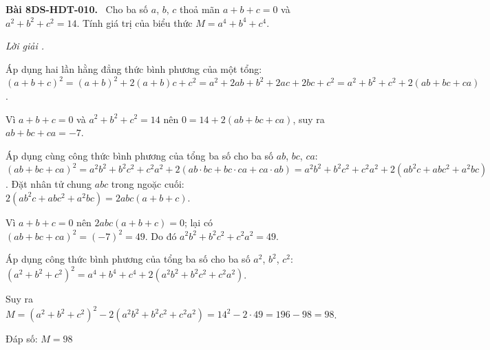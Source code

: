 \documentclass[12pt,a4paper]{article}
\newenvironment{problem}[1][]{\par\medskip\noindent\textbf{Bài #1.}\ }{\par}
\newenvironment{solution}[1][]{\par\noindent\textit{Lời giải #1.}\par}{\par}
\begin{document}
\begin{problem}[8DS-HDT-010]
Cho ba số $a$, $b$, $c$ thoả mãn $a + b + c = 0$ và $a^2 + b^2 + c^2 = 14$. Tính giá trị của biểu thức $M = a^4 + b^4 + c^4$.

\begin{solution}
Áp dụng hai lần hằng đẳng thức bình phương của một tổng: $(a + b + c)^2 = (a + b)^2 + 2(a + b)c + c^2 = a^2 + 2ab + b^2 + 2ac + 2bc + c^2 = a^2 + b^2 + c^2 + 2(ab + bc + ca)$.

Vì $a + b + c = 0$ và $a^2 + b^2 + c^2 = 14$ nên $0 = 14 + 2(ab + bc + ca)$, suy ra $ab + bc + ca = -7$.

Áp dụng cùng công thức bình phương của tổng ba số cho ba số $ab$, $bc$, $ca$: $(ab + bc + ca)^2 = a^2b^2 + b^2c^2 + c^2a^2 + 2(ab \cdot bc + bc \cdot ca + ca \cdot ab) = a^2b^2 + b^2c^2 + c^2a^2 + 2(ab^2c + abc^2 + a^2bc)$. Đặt nhân tử chung $abc$ trong ngoặc cuối: $2(ab^2c + abc^2 + a^2bc) = 2abc(a + b + c)$.

Vì $a + b + c = 0$ nên $2abc(a + b + c) = 0$; lại có $(ab + bc + ca)^2 = (-7)^2 = 49$. Do đó $a^2b^2 + b^2c^2 + c^2a^2 = 49$.

Áp dụng công thức bình phương của tổng ba số cho ba số $a^2$, $b^2$, $c^2$: $(a^2 + b^2 + c^2)^2 = a^4 + b^4 + c^4 + 2(a^2b^2 + b^2c^2 + c^2a^2)$.

Suy ra $M = (a^2 + b^2 + c^2)^2 - 2(a^2b^2 + b^2c^2 + c^2a^2) = 14^2 - 2 \cdot 49 = 196 - 98 = 98$.

Đáp số: $\boxed{M = 98}$
\end{solution}
\end{problem}
\end{document}
